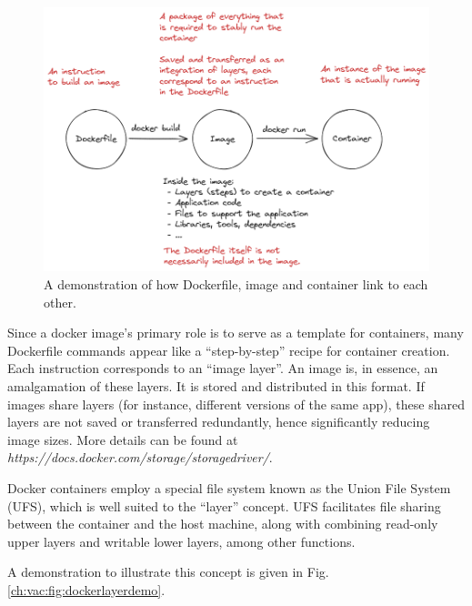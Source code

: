 \begin{figure}[!htb]
	\centering
	\includegraphics[width=350pt]{chapters/part-3/figures/dockerfiletoimage.png}
	\caption{A demonstration of how Dockerfile, image and container link to each other.} \label{ch:vac:fig:dockerfiletoimage}
\end{figure}

Since a docker image's primary role is to serve as a template for containers, many Dockerfile commands appear like a ``step-by-step'' recipe for container creation. Each instruction corresponds to an ``image layer''. An image is, in essence, an amalgamation of these layers. It is stored and distributed in this format. If images share layers (for instance, different versions of the same app), these shared layers are not saved or transferred redundantly, hence significantly reducing image sizes. More details can be found at \textit{https://docs.docker.com/storage/storagedriver/}.

\begin{shortbox}

Docker containers employ a special file system known as the Union File System (UFS), which is well suited to the ``layer'' concept. UFS facilitates file sharing between the container and the host machine, along with combining read-only upper layers and writable lower layers, among other functions. 

A demonstration to illustrate this concept is given in Fig. \ref{ch:vac:fig:dockerlayerdemo}.

\end{shortbox}


